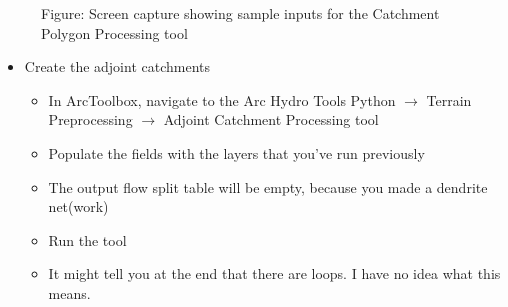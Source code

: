 \documentclass[letterpaper,10pt,english]{sphinxmanual}
\begin{document}
\begin{figure}[htbp]
\centering
\capstart

\noindent{}
\caption{Figure: Screen capture showing sample inputs for the Catchment Polygon Processing tool}\label{\detokenize{ex_2:id14}}\end{figure}
\begin{itemize}
\item {} 
Create the adjoint catchments
\begin{itemize}
\item {} 
In ArcToolbox, navigate to the Arc Hydro Tools Python \(\rightarrow\) Terrain Preprocessing \(\rightarrow\) Adjoint Catchment Processing tool

\item {} 
Populate the fields with the layers that you’ve run previously

\item {} 
The output flow split table will be empty, because you made a dendrite net(work)

\item {} 
Run the tool

\item {} 
It might tell you at the end that there are loops. I have no idea what this means.

\end{itemize}

\end{itemize}
\end{document}
